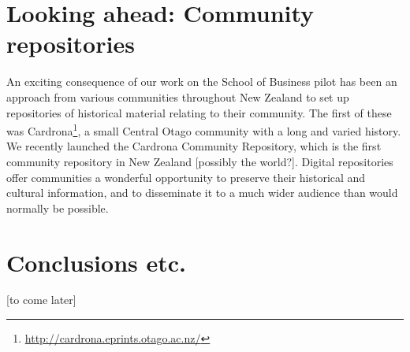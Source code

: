 \documentclass[12pt,pdftex,a4paper,titlepage]{article}
\begin{document}
\section{Looking ahead: Community repositories}

An exciting consequence of our work on the School of Business pilot has been an approach from various communities throughout New Zealand to set up repositories of historical material relating to their community. The first of these was Cardrona\footnote{\url{http://cardrona.eprints.otago.ac.nz/}}, a small Central Otago community with a long and varied history. We recently launched the Cardrona Community Repository, which is the first community repository in New Zealand [possibly the world?]. Digital repositories offer communities a wonderful opportunity to preserve their historical and cultural information, and to disseminate it to a much wider audience than would normally be possible.


\section{Conclusions etc.}

[to come later]



\end{document}
